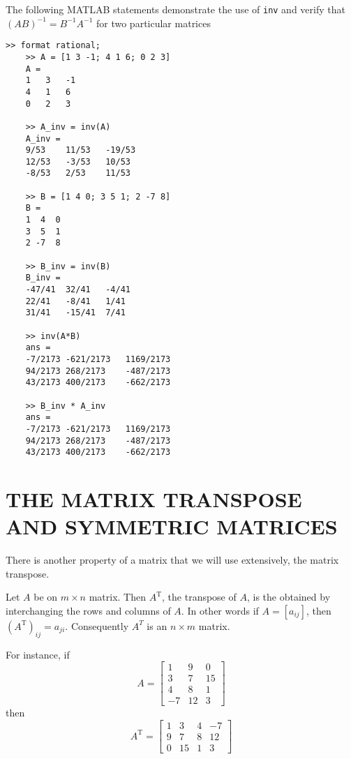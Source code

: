 \documentclass[../main.tex]{subfiles}
\begin{document}
\begin{example} The following MATLAB statements demonstrate the use of \texttt{inv} and verify that $(AB)^{-1} = B^{-1}A^{-1}$ for two particular matrices

\begin{lstlisting}[numbers=none,frame=none]
	>> format rational;
	>> A = [1 3 -1; 4 1 6; 0 2 3]
	A =
	1	3	-1
	4	1	6
	0	2	3

	>> A_inv = inv(A)
	A_inv =
	9/53	11/53	-19/53
	12/53	-3/53	10/53
	-8/53	2/53	11/53

	>> B = [1 4 0; 3 5 1; 2 -7 8]
	B =
	1  4  0
	3  5  1
	2 -7  8

	>> B_inv = inv(B)
	B_inv =
	-47/41	32/41	-4/41
	22/41	-8/41	1/41
	31/41	-15/41	7/41

	>> inv(A*B)
	ans =
	-7/2173	-621/2173	1169/2173
	94/2173	268/2173	-487/2173
	43/2173	400/2173	-662/2173

	>> B_inv * A_inv
	ans =
	-7/2173	-621/2173	1169/2173
	94/2173	268/2173	-487/2173
	43/2173	400/2173	-662/2173
\end{lstlisting}
\end{example}

\section[The Matrix Transpose and Symmetric Matrices]{THE MATRIX TRANSPOSE AND SYMMETRIC MATRICES}
\label{sec:sec_1_5}
There is another property of a matrix that we will use extensively, the matrix transpose.

\begin{definition}
\label{defn:defn_1_13}Let $A$ be on $m \times n$ matrix. Then $A^{\mathrm{T}}$, the transpose of $A$, is the obtained by interchanging the rows and columns of $A$. In other words if $A=\left[a_{i j}\right]$, then $\left(A^{\mathrm{T}}\right)_{i j}=a_{j i}$. Consequently $A^{T}$ is an $n \times m$ matrix.
\end{definition}

For instance, if
$$A=\left[\begin{array}{ccc}1 & 9 & 0 \\ 3 & 7 & 15 \\ 4 & 8 & 1 \\ -7 & 12 & 3\end{array}\right]$$
then
$$A^{\mathrm{T}}=\left[\begin{array}{cccc}1 & 3 & 4 & -7 \\ 9 & 7 & 8 & 12 \\ 0 & 15 & 1 & 3\end{array}\right]$$
\end{document}
